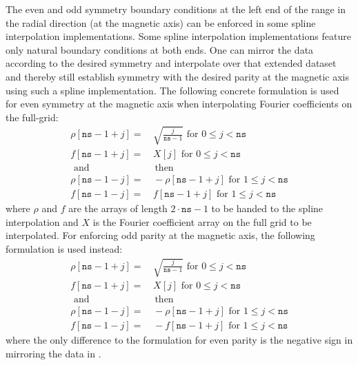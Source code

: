 The even and odd symmetry boundary conditions at the left end of the range
in the radial direction (at the magnetic axis) can be enforced in some spline
interpolation implementations.
%
Some spline interpolation implementations
feature only natural boundary conditions at both ends.
%
One can mirror the data according to the desired symmetry
and interpolate over that extended dataset
and thereby still establish symmetry with the desired parity at the magnetic axis
using such a spline implementation.
%
The following concrete formulation is used
for even symmetry at the magnetic axis when interpolating Fourier coefficients on the full-grid:
\begin{align}
 \rho[\texttt{ns} - 1 + j] =&\, \sqrt{ \frac{j}{\texttt{ns} - 1} } \textrm{ for } 0 \leq j < \texttt{ns} \\
 f[\texttt{ns} - 1 + j]    =&\, X[j]                               \textrm{ for } 0 \leq j < \texttt{ns} \\
 \textrm{ and }             & \textrm{ then } \nonumber \\
 \rho[\texttt{ns} - 1 - j] =&\, -\rho[\texttt{ns} - 1 + j]         \textrm{ for } 1 \leq j < \texttt{ns} \\
 f[\texttt{ns} - 1 - j]    =&\, f[\texttt{ns} - 1 + j]             \textrm{ for } 1 \leq j < \texttt{ns}
\end{align}
where $\rho$ and $f$ are the arrays of length $2 \cdot \texttt{ns} - 1$ to be handed to the spline interpolation
and $X$ is the Fourier coefficient array on the full grid to be interpolated.
%
For enforcing odd parity at the magnetic axis,
the following formulation is used instead:
\begin{align}
 \rho[\texttt{ns} - 1 + j] =&\, \sqrt{ \frac{j}{\texttt{ns} - 1} } \textrm{ for } 0 \leq j < \texttt{ns} \\
 f[\texttt{ns} - 1 + j]    =&\, X[j]                               \textrm{ for } 0 \leq j < \texttt{ns} \\
 \textrm{ and }             & \textrm{ then } \nonumber \\
 \rho[\texttt{ns} - 1 - j] =&\, -\rho[\texttt{ns} - 1 + j]         \textrm{ for } 1 \leq j < \texttt{ns} \\
 f[\texttt{ns} - 1 - j]    =&\, -f[\texttt{ns} - 1 + j]            \textrm{ for } 1 \leq j < \texttt{ns} \label{eqn:mirror_odd}
\end{align}
where the only difference to the formulation for even parity
is the negative sign in mirroring the data in .

